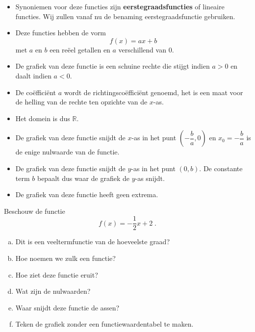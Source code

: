 \documentclass[12pt]{article}
\begin{document}
\begin{itemize}
\item Synoniemen voor deze functies zijn {\bf eerstegraadsfuncties} of lineaire functies. Wij zullen vanaf nu de benaming eerstegraadsfunctie gebruiken.
\item Deze functies hebben de vorm
  $$f(x) = ax+b $$
  met $a$ en $b$ een reëel getallen en $a$ verschillend van $0$.
\item De grafiek van deze functie is een schuine rechte die stijgt indien $a > 0$ en daalt indien $a<0$.
\item De coëfficiënt $a$ wordt de richtingscoëfficiënt genoemd, het is een maat voor de helling van de rechte ten opzichte van de $x$-as.
\item Het domein is dus $\mathbb{R}$.
\item De grafiek van deze functie snijdt de $x$-as in het punt $(-\dfrac{b}{a}, 0)$ en $x_0=-\dfrac{b}{a}$ is de enige nulwaarde van de functie.
\item De grafiek van deze functie snijdt de $y$-as in het punt $(0, b)$. De constante term $b$ bepaalt dus waar de grafiek de $y$-as snijdt.
\item De grafiek van deze functie heeft geen extrema.
\end{itemize}



\begin{oefening}
  Beschouw de functie
  $$f(x)=-\dfrac{1}{2}x+2\;.$$
  \begin{enumerate}[(a)]
  \item Dit is een veeltermfunctie van de hoeveelste graad?
  \item Hoe noemen we zulk een functie?
  \item Hoe ziet deze functie eruit?
  \item Wat zijn de nulwaarden?
  \item Waar snijdt deze functie de assen?
  \item Teken de grafiek zonder een functiewaardentabel te maken.
  \end{enumerate}
\end{oefening}
\end{document}

